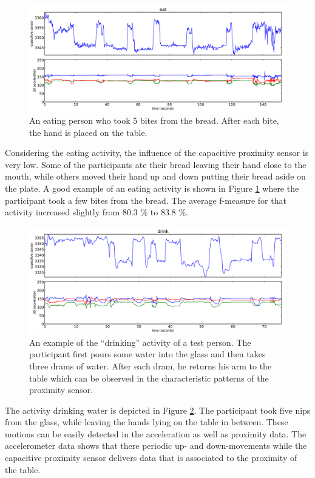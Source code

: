 \documentclass[runningheads,a4paper]{llncs}
\begin{document}
\begin{figure}
	\centering
		\includegraphics[width=\textwidth]{../Auswertung/images/eugen_6.pdf}
	\caption{An eating person who took 5 bites from the bread. After each bite, the hand is placed on the table.}
	\label{fig:eugen_6}
\end{figure}

Considering the eating activity, the influence of the capacitive proximity sensor is very low. Some of the participants ate their bread leaving their hand close to the mouth, while others moved their hand up and down putting their bread aside on the plate. A good example of an eating activity is shown in Figure \ref{fig:eugen_6} where the participant took a few bites from the bread. The average f-measure for that activity increased slightly from 80.3 \% to 83.8 \%. 

\begin{figure}
	\centering
		\includegraphics[width=\textwidth]{../Auswertung/images/eugen_7.pdf}
	\caption{An example of the ``drinking'' activity of a test person. The participant first pours some water into the glass and then takes three drams of water. After each dram, he returns his arm to the table which can be observed in the characteristic patterns of the proximity sensor.}
	\label{fig:eugen_7}
\end{figure}

The activity drinking water is depicted in Figure \ref{fig:eugen_7}. The participant took five nips from the glass, while leaving the hands lying on the table in between. These motions can be easily detected in the acceleration as well as proximity data. The accelerometer data shows that there periodic up- and down-movements while the capacitive proximity sensor delivers data that is associated to the proximity of the table.
\end{document}
